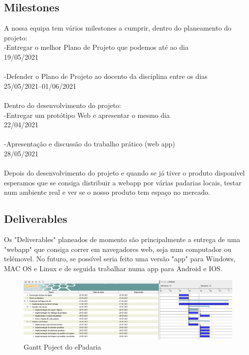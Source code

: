 \subsection{Milestones}
A nossa equipa tem vários milestones a cumprir, dentro do planeamento do projeto:
\\-Entregar o melhor Plano de Projeto que podemos até ao dia \\19/05/2021\\
\\-Defender o Plano de Projeto ao docento da disciplina entre os dias\\ 25/05/2021--01/06/2021\\
\\Dentro do desenvolvimento do projeto:
\\-Entregar um protótipo Web e apresentar o mesmo dia \\22/04/2021\\
\\-Apresentação e discussão do trabalho prático (web app) \\28/05/2021
\\\\Depois do desenvolvimento do projeto e quando se já tiver o produto disponível esperamos que se consiga distribuir a webapp por várias padarias locais, testar num ambiente real e ver se o nosso produto tem espaço no mercado.

\subsection{Deliverables}
Os "Deliverables" planeados de momento são principalmente a entrega de uma "webapp" que consiga correr em navegadores web, seja num computador ou telémovel. No futuro, se possível seria feito uma versão "app" para Windows, MAC OS e Linux e de seguida trabalhar numa app para Android e IOS.\\

\begin{figure}[H]
	\centering
	\includegraphics[width=20cm,angle =90 ]{gantt}
	\caption{Gantt Poject do ePadaria}
	\label{fig:gantt}
\end{figure}